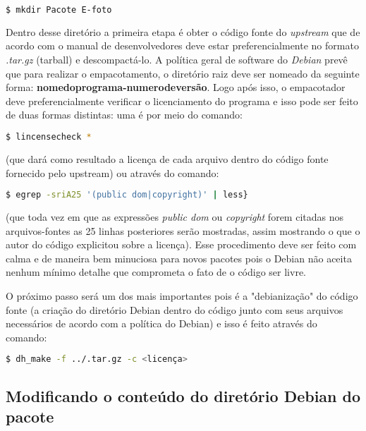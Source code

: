 \begin{lstlisting}[language=bash]
	$ mkdir Pacote E-foto 
\end{lstlisting} 

Dentro desse diretório a primeira etapa é obter o código fonte do \textit{upstream} que de acordo com o manual de desenvolvedores deve estar preferencialmente no formato \textit{.tar.gz} (tarball) e descompactá-lo. A política geral de software do \textit{Debian} prevê que para realizar o empacotamento, o diretório raiz deve ser nomeado da seguinte forma: \textbf{nomedoprograma-numerodeversão}. Logo após isso, o empacotador deve preferencialmente verificar o licenciamento do programa e isso pode ser feito de duas formas distintas: uma é por meio do comando:

\begin{lstlisting}[language=bash]
	$ lincensecheck *
\end{lstlisting}  %

(que dará como resultado a licença de cada arquivo dentro do código fonte fornecido pelo upstream) ou através do comando: 

\begin{lstlisting}[language=bash]
	$ egrep -sriA25 '(public dom|copyright)' | less} 
\end{lstlisting}

(que toda vez em que as expressões \textit{public dom} ou \textit{copyright} forem citadas nos arquivos-fontes as 25 linhas posteriores serão mostradas, assim mostrando o que o autor do código explicitou sobre a licença). Esse procedimento deve ser feito com calma e de maneira bem minuciosa para novos pacotes pois o Debian não aceita nenhum mínimo detalhe que comprometa o fato de o código ser livre.

O próximo passo será um dos mais importantes pois é a "debianização" do código fonte (a criação do diretório Debian dentro do código junto com seus arquivos necessários de acordo com a política do Debian) e isso é feito através do comando:

\begin{lstlisting}[language=bash]
	$ dh_make -f ../.tar.gz -c <licença> 
\end{lstlisting} 

\subsection{Modificando o conteúdo do diretório Debian do pacote}

